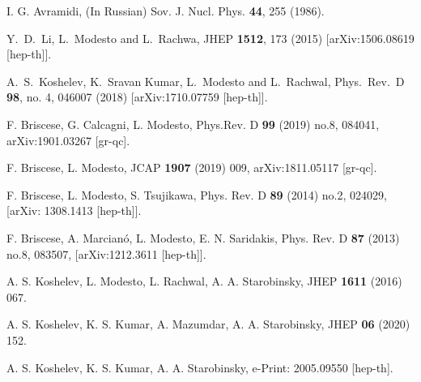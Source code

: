 \documentclass[a4paper,11pt]{article}
\begin{document}
\begin{thebibliography}{99}
I. G. Avramidi, 
(In Russian) Sov. J. Nucl. Phys.
{\bf 44}, 255 (1986).



Y.~D.~Li, L.~Modesto and L.~Rachwa,
JHEP {\bf 1512}, 173 (2015)
[arXiv:1506.08619 [hep-th]].


A.~S.~Koshelev, K.~Sravan Kumar, L.~Modesto and L.~Rachwal,
Phys.\ Rev.\ D {\bf 98}, no. 4, 046007 (2018)
[arXiv:1710.07759 [hep-th]].




F. Briscese, G. Calcagni, L. Modesto, 
Phys.Rev. D {\bf 99} (2019) no.8, 084041, arXiv:1901.03267 [gr-qc].

F. Briscese,  L. Modesto,  
JCAP {\bf 1907} (2019) 009,
arXiv:1811.05117 [gr-qc].



 F. Briscese, L. Modesto, S. Tsujikawa, Phys. Rev. D {\bf 89} (2014) no.2, 024029, [arXiv: 1308.1413 [hep-th]].

 F. Briscese, A. Marcian\'o, L. Modesto, E. N. Saridakis, Phys. Rev. D {\bf 87} (2013) no.8, 083507, [arXiv:1212.3611 [hep-th]].




 A. S. Koshelev, L. Modesto, L. Rachwal, A. A. Starobinsky, JHEP {\bf 1611} (2016) 067.



 A. S. Koshelev, K. S. Kumar, A. Mazumdar, A. A. Starobinsky, JHEP {\bf 06} (2020) 152.

 A. S. Koshelev, K. S. Kumar, A. A. Starobinsky, e-Print: 2005.09550 [hep-th].














\end{thebibliography}
\end{document}
